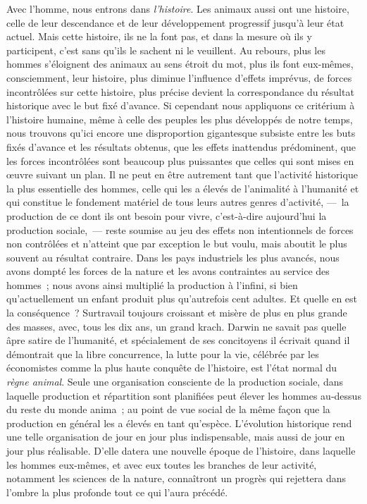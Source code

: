 \documentclass[french,twoside]{book} %
\begin{document}
Avec l’homme, nous entrons dans \emph{l’histoire}. Les animaux aussi ont une histoire, celle de leur descendance et de leur développement progressif jusqu’à leur état actuel. Mais cette histoire, ils ne la font pas, et dans la mesure où ils y participent, c’est sans qu’ils le sachent ni le veuillent. Au rebours, plus les hommes s’éloignent des animaux au sens étroit du mot, plus ils font eux-mêmes, consciemment, leur histoire, plus diminue l’influence d’effets imprévus, de forces incontrôlées sur cette histoire, plus précise devient la correspondance du résultat historique avec le but fixé d’avance. Si cependant nous appliquons ce critérium à l’histoire humaine, même à celle des peuples les plus développés de notre temps, nous trouvons qu’ici encore une disproportion gigantesque subsiste entre les buts fixés d’avance et les résultats obtenus, que les effets inattendus prédominent, que les forces incontrôlées sont beaucoup plus puissantes que celles qui sont mises en œuvre suivant un plan. Il ne peut en être autrement tant que l’activité historique la plus essentielle des hommes, celle qui les a élevés de l’animalité à l’humanité et qui constitue le fondement matériel de tous leurs autres genres d’activité, — la production de ce dont ils ont besoin pour vivre, c’est-à-dire aujourd’hui la production sociale, — reste soumise au jeu des effets non intentionnels de forces non contrôlées et n’atteint que par exception le but voulu, mais aboutit le plus souvent au résultat contraire. Dans les pays industriels les plus avancés, nous avons dompté les forces de la nature et les avons contraintes au service des hommes ; nous avons ainsi multiplié la production à l’infini, si bien qu’actuellement un enfant produit plus qu’autrefois cent adultes. Et quelle en est la conséquence ? Surtravail toujours croissant et misère de plus en plus grande des masses, avec, tous les dix ans, un grand krach. Darwin ne savait pas quelle âpre satire de l’humanité, et spécialement de ses concitoyens il écrivait quand il démontrait que la libre concurrence, la lutte pour la vie, célébrée par les économistes comme la plus haute conquête de l’histoire, est l’état normal du \emph{règne animal}. Seule une organisation consciente de la production sociale, dans laquelle production et répartition sont planifiées peut élever les hommes au-dessus du reste du monde anima ; au point de vue social de la même façon que la production en général les a élevés en tant qu’espèce. L’évolution historique rend une telle organisation de jour en jour plus indispensable, mais aussi de jour en jour plus réalisable. D’elle datera une nouvelle époque de l’histoire, dans laquelle les hommes eux-mêmes, et avec eux toutes les branches de leur activité, notamment les sciences de la nature, connaîtront un progrès qui rejettera dans l’ombre la plus profonde tout ce qui l’aura précédé.
\end{document}
